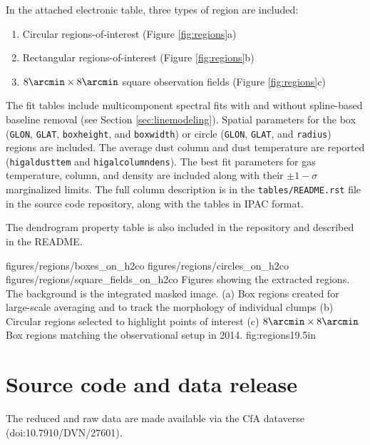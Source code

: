 In the attached electronic table, three types of region are included: 
\begin{enumerate}
    \item Circular regions-of-interest (Figure \ref{fig:regions}a)
    \item Rectangular regions-of-interest (Figure \ref{fig:regions}b)
    \item $8\arcmin \times 8\arcmin$ square observation fields (Figure \ref{fig:regions}c)
\end{enumerate}
The fit tables include multicomponent spectral fits with and without
spline-based baseline removal (see Section \ref{sec:linemodeling}).
Spatial parameters for the box (\texttt{GLON}, \texttt{GLAT},
\texttt{boxheight}, and \texttt{boxwidth}) or circle (\texttt{GLON},
\texttt{GLAT}, and \texttt{radius}) regions are included.  The average dust
column and dust temperature are reported (\texttt{higaldusttem} and
\texttt{higalcolumndens}).  The best fit parameters for gas temperature, \para
column, and \hh density are included along with their $\pm1-\sigma$ marginalized
limits.  The full column description is in the \texttt{tables/README.rst} file
in the source code repository, along with the tables in IPAC format.

The dendrogram property table is also included in the repository and described
in the README.

\RotFigureThreeAA
{figures/regions/boxes_on_h2co}
{figures/regions/circles_on_h2co}
{figures/regions/square_fields_on_h2co}
{Figures showing the extracted regions.  The background is the integrated
masked \para \threeohthree image. (a) Box regions created for large-scale averaging
and to track the morphology of individual clumps  (b) Circular regions selected
to highlight points of interest (c) $8\arcmin \times 8\arcmin$ Box regions
matching the observational setup in 2014.}
{fig:regions}{1}{9.5in}

\section{Source code and data release}
The reduced and raw data are made available via the CfA dataverse
(doi:10.7910/DVN/27601).


